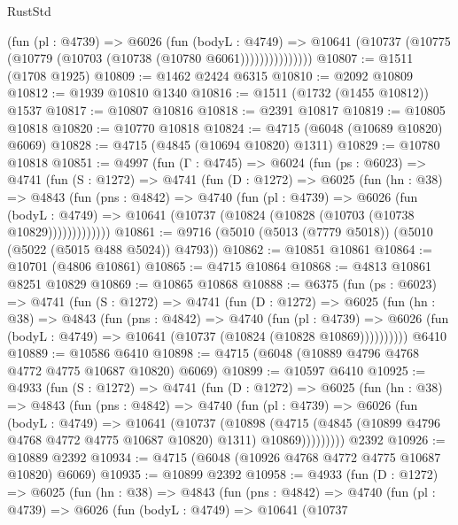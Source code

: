 \begin{lexlean}{RustStd}
\begin{coremodule}
                  (fun (pl : @4739) =>
                  @6026
                    (fun (bodyL : @4749) =>
                    @10641 (@10737 (@10775 (@10779 (@10703 (@10738 (@10780 @6061)))))))))))))))
@10807 := @1511 (@1708 @1925)
@10809 := @1462 @2424 @6315
@10810 := @2092 @10809
@10812 := @1939 @10810 @1340
@10816 := @1511 (@1732 (@1455 @10812)) @1537
@10817 := @10807 @10816
@10818 := @2391 @10817
@10819 := @10805 @10818
@10820 := @10770 @10818
@10824 := @4715 (@6048 (@10689 @10820) @6069)
@10828 := @4715 (@4845 (@10694 @10820) @1311)
@10829 := @10780 @10818
@10851 := @4997
    (fun (Γ : @4745) =>
    @6024
      (fun (ps : @6023) =>
      @4741
        (fun (S : @1272) =>
        @4741
          (fun (D : @1272) =>
          @6025
            (fun (hn : @38) =>
            @4843
              (fun (pns : @4842) =>
              @4740
                (fun (pl : @4739) =>
                @6026
                  (fun (bodyL : @4749) =>
                  @10641 (@10737 (@10824 (@10828 (@10703 (@10738 @10829)))))))))))))
@10861 := @9716 (@5010 (@5013 (@7779 @5018)) (@5010 (@5022 (@5015 @488 @5024)) @4793))
@10862 := @10851 @10861
@10864 := @10701 (@4806 @10861)
@10865 := @4715 @10864
@10868 := @4813 @10861 @8251 @10829
@10869 := @10865 @10868
@10888 := @6375
    (fun (ps : @6023) =>
    @4741
      (fun (S : @1272) =>
      @4741
        (fun (D : @1272) =>
        @6025
          (fun (hn : @38) =>
          @4843
            (fun (pns : @4842) =>
            @4740
              (fun (pl : @4739) =>
              @6026 (fun (bodyL : @4749) => @10641 (@10737 (@10824 (@10828 @10869))))))))))
    @6410
@10889 := @10586 @6410
@10898 := @4715 (@6048 (@10889 @4796 @4768 @4772 @4775 @10687 @10820) @6069)
@10899 := @10597 @6410
@10925 := @4933
    (fun (S : @1272) =>
    @4741
      (fun (D : @1272) =>
      @6025
        (fun (hn : @38) =>
        @4843
          (fun (pns : @4842) =>
          @4740
            (fun (pl : @4739) =>
            @6026
              (fun (bodyL : @4749) =>
              @10641
                (@10737
                  (@10898
                    (@4715
                      (@4845 (@10899 @4796 @4768 @4772 @4775 @10687 @10820) @1311)
                      @10869)))))))))
    @2392
@10926 := @10889 @2392
@10934 := @4715 (@6048 (@10926 @4768 @4772 @4775 @10687 @10820) @6069)
@10935 := @10899 @2392
@10958 := @4933
    (fun (D : @1272) =>
    @6025
      (fun (hn : @38) =>
      @4843
        (fun (pns : @4842) =>
        @4740
          (fun (pl : @4739) =>
          @6026
            (fun (bodyL : @4749) =>
            @10641
              (@10737

\end{coremodule}
\end{lexlean}
